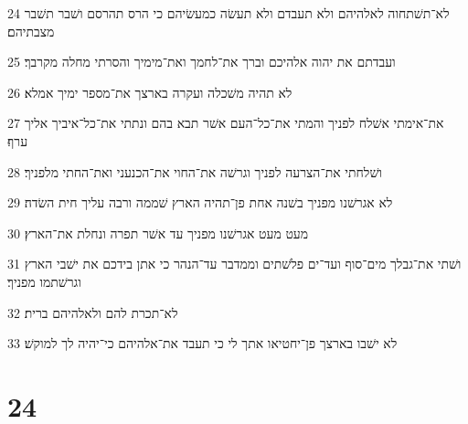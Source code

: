 \par 24 לא־תשׁתחוה לאלהיהם ולא תעבדם ולא תעשׂה כמעשׂיהם כי הרס תהרסם ושׁבר תשׁבר מצבתיהם׃
\par 25 ועבדתם את יהוה אלהיכם וברך את־לחמך ואת־מימיך והסרתי מחלה מקרבך׃
\par 26 לא תהיה משׁכלה ועקרה בארצך את־מספר ימיך אמלא׃
\par 27 את־אימתי אשׁלח לפניך והמתי את־כל־העם אשׁר תבא בהם ונתתי את־כל־איביך אליך ערף׃
\par 28 ושׁלחתי את־הצרעה לפניך וגרשׁה את־החוי את־הכנעני ואת־החתי מלפניך׃
\par 29 לא אגרשׁנו מפניך בשׁנה אחת פן־תהיה הארץ שׁממה ורבה עליך חית השׂדה׃
\par 30 מעט מעט אגרשׁנו מפניך עד אשׁר תפרה ונחלת את־הארץ׃
\par 31 ושׁתי את־גבלך מים־סוף ועד־ים פלשׁתים וממדבר עד־הנהר כי אתן בידכם את ישׁבי הארץ וגרשׁתמו מפניך׃
\par 32 לא־תכרת להם ולאלהיהם ברית׃
\par 33 לא ישׁבו בארצך פן־יחטיאו אתך לי כי תעבד את־אלהיהם כי־יהיה לך למוקשׁ׃

\chapter{24}

